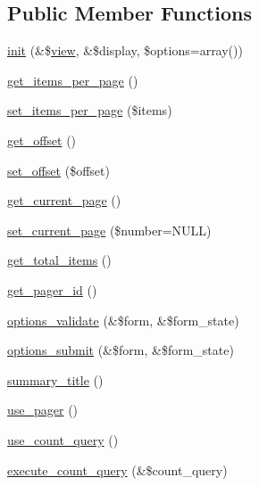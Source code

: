 \subsection*{Public Member Functions}
\begin{DoxyCompactItemize}
\item 
\hyperlink{classviews__plugin__pager_a3096789b9b8d3a912a6c5fb0ca8917a5}{init} (\&\$\hyperlink{classview}{view}, \&\$display, \$options=array())
\item 
\hyperlink{classviews__plugin__pager_abdae5c9965b541f4b54fb7dae64bfc70}{get\_\-items\_\-per\_\-page} ()
\item 
\hyperlink{classviews__plugin__pager_aeebe569dd61b8a402d7349a9ac5a7096}{set\_\-items\_\-per\_\-page} (\$items)
\item 
\hyperlink{classviews__plugin__pager_a2feec47a258f0d70485456022591feaf}{get\_\-offset} ()
\item 
\hyperlink{classviews__plugin__pager_a115eca3dda0b25083b10148dcf2a1f61}{set\_\-offset} (\$offset)
\item 
\hyperlink{classviews__plugin__pager_a6e9c4827b565d7a7c7d424669d736493}{get\_\-current\_\-page} ()
\item 
\hyperlink{classviews__plugin__pager_ab79949456c53589c17ca262732aabf4b}{set\_\-current\_\-page} (\$number=NULL)
\item 
\hyperlink{classviews__plugin__pager_a2dc88a3b98d258154d9289ccd1bd2078}{get\_\-total\_\-items} ()
\item 
\hyperlink{classviews__plugin__pager_aa6291d10f42e3365c0e01efacf4df32f}{get\_\-pager\_\-id} ()
\item 
\hyperlink{classviews__plugin__pager_a5988e87c8ebcaed872cad117e9721515}{options\_\-validate} (\&\$form, \&\$form\_\-state)
\item 
\hyperlink{classviews__plugin__pager_a4e0e01490e6854df429e0136b236073b}{options\_\-submit} (\&\$form, \&\$form\_\-state)
\item 
\hyperlink{classviews__plugin__pager_a12df2a012d53b9276a14fae94511f686}{summary\_\-title} ()
\item 
\hyperlink{classviews__plugin__pager_a0b77996aaa7a7b23effc4d3a6e055659}{use\_\-pager} ()
\item 
\hyperlink{classviews__plugin__pager_a693a102e85a9b63bc59057a4efca0d12}{use\_\-count\_\-query} ()
\item 
\hyperlink{classviews__plugin__pager_a6d6e0ff79b5744f88a47d932ec68cfeb}{execute\_\-count\_\-query} (\&\$count\_\-query)
\item 

\end{DoxyCompactItemize}
